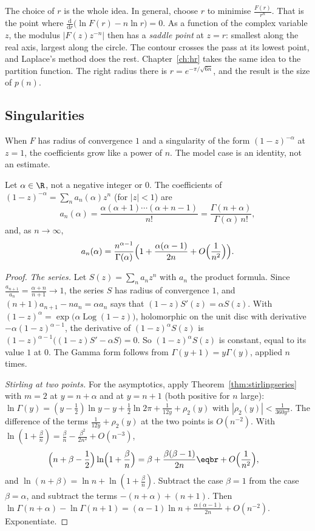 The choice of $r$ is the whole idea. In general, choose $r$ to minimise $\frac{F(r)}{r^n}$. That is the point where $\frac{\mathrm d}{\mathrm dr}\bigl(\ln F(r)-n\ln r\bigr)=0$. As a function of the complex variable $z$, the modulus $|F(z)z^{-n}|$ then has a \emph{saddle point} at $z=r$: smallest along the real axis, largest along the circle. The contour crosses the pass at its lowest point, and Laplace's method does the rest. Chapter~\ref{ch:hr} takes the same idea to the partition function. The right radius there is $r=e^{-\pi/\sqrt{6n}}$, and the result is the size of $p(n)$.

\subsection*{Singularities}

When $F$ has radius of convergence $1$ and a singularity of the form $(1-z)^{-\alpha}$ at $z=1$, the coefficients grow like a power of $n$. The model case is an identity, not an estimate.

\begin{proposition}\label{prop:binomcoef}
Let $\alpha\in\R$, not a negative integer or $0$. The coefficients of $(1-z)^{-\alpha}=\sum_na_n(\alpha)z^n$ (for $|z|<1$) are
\[
a_n(\alpha)=\frac{\alpha(\alpha+1)\cdots(\alpha+n-1)}{n!}=\frac{\Gamma(n+\alpha)}{\Gamma(\alpha)\,n!},
\]
and, as $n\to\infty$,
\[
a_n(\alpha)=\frac{n^{\alpha-1}}{\Gamma(\alpha)}\Bigl(1+\frac{\alpha(\alpha-1)}{2n}+O\Bigl(\frac1{n^2}\Bigr)\Bigr).
\]
\end{proposition}
\begin{proof}
\emph{The series.} Let $S(z)=\sum_na_nz^n$ with $a_n$ the product formula. Since $\frac{a_{n+1}}{a_n}=\frac{\alpha+n}{n+1}\to1$, the series $S$ has radius of convergence $1$, and $(n+1)a_{n+1}-na_n=\alpha a_n$ says that $(1-z)S'(z)=\alpha S(z)$. With $(1-z)^\alpha=\exp\bigl(\alpha\operatorname{Log}(1-z)\bigr)$, holomorphic on the unit disc with derivative $-\alpha(1-z)^{\alpha-1}$, the derivative of $(1-z)^\alpha S(z)$ is $(1-z)^{\alpha-1}\bigl((1-z)S'-\alpha S\bigr)=0$. So $(1-z)^\alpha S(z)$ is constant, equal to its value $1$ at $0$. The Gamma form follows from $\Gamma(y+1)=y\Gamma(y)$, applied $n$ times.

\emph{Stirling at two points.} For the asymptotics, apply Theorem~\ref{thm:stirlingseries} with $m=2$ at $y=n+\alpha$ and at $y=n+1$ (both positive for $n$ large): $\ln\Gamma(y)=(y-\frac12)\ln y-y+\frac12\ln2\pi+\frac1{12y}+\rho_2(y)$ with $|\rho_2(y)|<\frac1{360y^3}$. The difference of the terms $\frac1{12y}+\rho_2(y)$ at the two points is $O(n^{-2})$. With $\ln(1+\frac\beta n)=\frac\beta n-\frac{\beta^2}{2n^2}+O(n^{-3})$,
\[
\begin{aligned}\Bigl(n+\beta-\frac12\Bigr)\ln\Bigl(1+\frac\beta n\Bigr)&=\beta+\frac{\beta(\beta-1)}{2n}\eqbr+O\Bigl(\frac1{n^2}\Bigr),\end{aligned}
\]
and $\ln(n+\beta)=\ln n+\ln(1+\frac\beta n)$. Subtract the case $\beta=1$ from the case $\beta=\alpha$, and subtract the terms $-(n+\alpha)+(n+1)$. Then $\ln\Gamma(n+\alpha)-\ln\Gamma(n+1)=(\alpha-1)\ln n+\frac{\alpha(\alpha-1)}{2n}+O(n^{-2})$. Exponentiate.
\end{proof}

